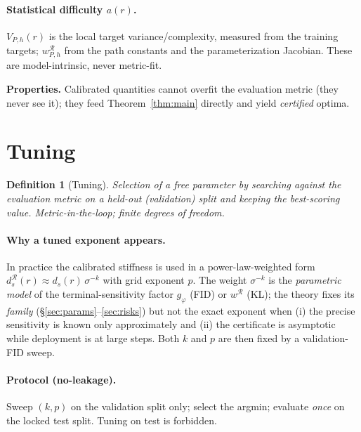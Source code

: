 \documentclass[11pt]{article}
\newtheorem{definition}{Definition}
\newcommand{\R}{\mathcal R}
\begin{document}
\paragraph{Statistical difficulty $a(r)$.}
$V_{P,h}(r)$ is the local target variance/complexity, measured from the
training targets; $w^\R_{P,h}$ from the path constants and the
parameterization Jacobian. These are model-intrinsic, never metric-fit.

\noindent\textbf{Properties.} Calibrated quantities cannot overfit the
evaluation metric (they never see it); they feed Theorem~\ref{thm:main}
directly and yield \emph{certified} optima.

\section{Tuning}
\label{sec:tuning}

\begin{definition}[Tuning]
Selection of a free parameter by searching against the evaluation metric
on a held-out (validation) split and keeping the best-scoring value.
Metric-in-the-loop; finite degrees of freedom.
\end{definition}

\paragraph{Why a tuned exponent appears.}
In practice the calibrated stiffness is used in a power-law-weighted form
$d^\R_s(r)\approx d_s(r)\,\sigma^{-k}$ with grid exponent $p$. The
weight $\sigma^{-k}$ is the \emph{parametric model} of the
terminal-sensitivity factor $g_\varphi$ (FID) or $w^\R$ (KL); the theory
fixes its \emph{family} (\S\ref{sec:params}--\ref{sec:risks}) but not the
exact exponent when (i) the precise sensitivity is known only
approximately and (ii) the certificate is asymptotic while deployment is
at large steps. Both $k$ and $p$ are then fixed by a validation-FID sweep.

\paragraph{Protocol (no-leakage).}
Sweep $(k,p)$ on the validation split only; select the argmin; evaluate
\emph{once} on the locked test split. Tuning on test is forbidden.
\end{document}
